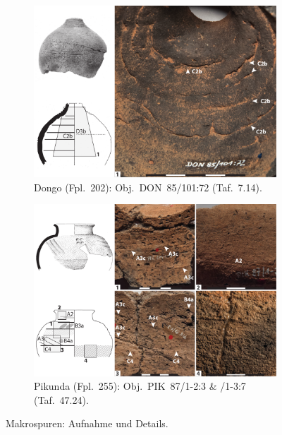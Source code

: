 \begin{multicols}{2}
\begin{figure}[p]
	\centering
	\begin{subfigure}{\textwidth}
		\centering
		\includegraphics[width = \textwidth]{fig/Abb_Macrotraces/DON85-101-72.pdf}
		\caption{Dongo (Fpl.~202): Obj.~DON~85/101:72 (Taf.~7.14).\vspace{1em}}
		\label{DON85-101-71_Makrospuren}
	\end{subfigure}
	\begin{subfigure}{\textwidth}
		\centering
		\includegraphics[width = \textwidth]{fig/Abb_Macrotraces/PIK87-1-2-3_1-3-7.pdf}
		\caption{Pikunda (Fpl.~255): Obj.~PIK~87/1-2:3 \& /1-3:7 (Taf.~47.24).}
		\label{PIK87-1-2-3_1-3-7_Makrospuren}
	\end{subfigure}
	\caption{Makrospuren: Aufnahme und Details.}
\end{figure}


\end{multicols}
